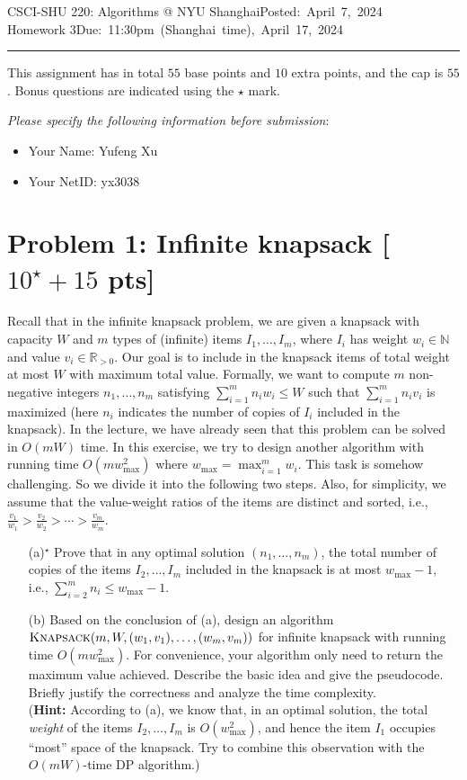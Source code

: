 \documentclass[11pt,twoside]{article}
\makeatletter
\newcommand{\homework}[1]{
   \pagestyle{myheadings}
   \thispagestyle{plain}
   \newpage
   \setcounter{page}{1}
   \noindent
   \classname \hfill \mbox{\updatedday} \\
   \instname \hfill \mbox{\duedate}
   \rule{6.5in}{0.5mm}
   \vspace*{-0.1 in}
}
\newcommand{\problem}[1]{\section*{Problem #1}}
\def\classname{CSCI-SHU 220: Algorithms @ NYU Shanghai}
\def\updatedday{Posted: April 7, 2024}
\def\duedate{Due: 11:30pm (Shanghai time), April 17, 2024}
\def\instname{Homework 3}
\makeatother
\begin{document}
\homework{1}

This assignment has in total $55$ base points and $10$ extra points, and the cap is $55$.
Bonus questions are indicated using the $\star$ mark.

\textit{Please specify the following information before submission}:
\begin{itemize}
    \item Your Name: Yufeng Xu %
    \item Your NetID: yx3038 %
\end{itemize}

\problem{1: Infinite knapsack [$10^\star+15$ pts]}
Recall that in the infinite knapsack problem, we are given a knapsack with capacity $W$ and $m$ types of (infinite) items $I_1,\dots,I_m$, where $I_i$ has weight $w_i \in \mathbb{N}$ and value $v_i \in \mathbb{R}_{>0}$.
Our goal is to include in the knapsack items of total weight at most $W$ with maximum total value.
Formally, we want to compute $m$ non-negative integers $n_1,\dots,n_m$ satisfying $\sum_{i=1}^m n_i w_i \leq W$ such that $\sum_{i=1}^m n_i v_i$ is maximized (here $n_i$ indicates the number of copies of $I_i$ included in the knapsack).
In the lecture, we have already seen that this problem can be solved in $O(mW)$ time.
In this exercise, we try to design another algorithm with running time $O(mw_{\max}^2)$ where $w_{\max} = \max_{i=1}^m w_i$.
This task is somehow challenging.
So we divide it into the following two steps.
Also, for simplicity, we assume that the value-weight ratios of the items are distinct and sorted, i.e., $\frac{v_1}{w_1} > \frac{v_2}{w_2} > \cdots > \frac{v_m}{w_m}$.

\begin{enumerate}
    \item[(a)$^\star$] Prove that in any optimal solution $(n_1,\dots,n_m)$, the total number of copies of the items $I_2,\dots,I_m$ included in the knapsack is at most $w_{\max}-1$, i.e., $\sum_{i=2}^m n_i \leq w_{\max}-1$.
    \item[(b)] Based on the conclusion of (a), design an algorithm $\textsc{Knapsack}(m,W,(w_1,v_1),\dots,(w_m,v_m))$ for infinite knapsack with running time $O(mw_{\max}^2)$.
    For convenience, your algorithm only need to return the maximum value achieved.
    Describe the basic idea and give the pseudocode.
    Briefly justify the correctness and analyze the time complexity. \\[1ex]
    (\textbf{Hint:} According to (a), we know that, in an optimal solution, the total \textit{weight} of the items $I_2,\dots,I_m$ is $O(w_{\max}^2)$, and hence the item $I_1$ occupies ``most'' space of the knapsack. Try to combine this observation with the $O(mW)$-time DP algorithm.)
\end{enumerate}
\end{document}
